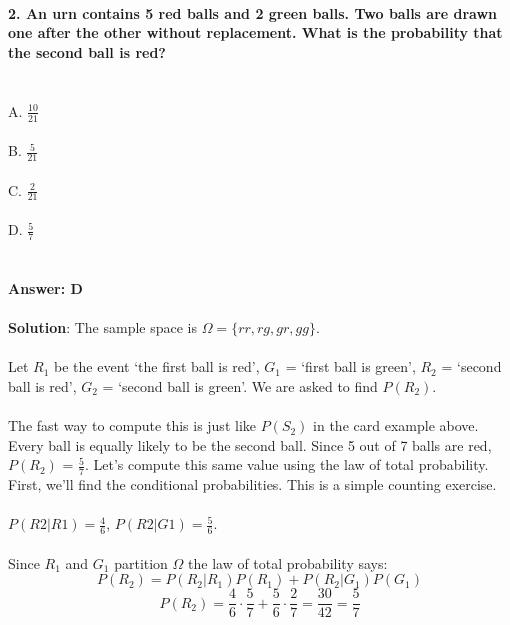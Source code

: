 \documentclass[prl,twocolumn,showpacs,preprintnumbers,superscriptaddress]{revtex4}
\theoremstyle{plain}
\theoremstyle{definition}
\begin{document}
\begin{widetext}
\\
\\
\\
\textbf{2. An urn contains 5 red balls and 2 green balls. Two balls are drawn one after the other without replacement. What is the probability that the second ball is red?}
\\
\\
\\
A. $\frac{10}{21}$\\
\\
B. $\frac{5}{21}$\\
\\
C. $\frac{2}{21}$\\
\\
D. $\frac{5}{7}$
\\
\\
\\
\textbf{Answer: D}
\\
\\
\textbf{Solution}:
The sample space is $\Omega = \{rr, rg, gr, gg\}$.
\\
\\
Let $R_{1}$ be the event ‘the first ball is red’, $G_{1}$ = ‘first ball is green’, $R_{2}$ = ‘second ball is red’, $G_{2}$ = ‘second ball is green’. We are asked to find $P(R_{2})$.
\\
\\
The fast way to compute this is just like $P(S_{2})$ in the card example above. Every ball is equally likely to be the second ball. Since 5 out of 7 balls are red, $P(R_{2})$ = $\frac{5}{7}$.
Let’s compute this same value using the law of total probability. First, we’ll find the conditional probabilities. This is a simple counting exercise.
\\
\\
$P(R2|R1) = \frac{4}{6}$, $P(R2|G1) = \frac{5}{6}$.
\\
\\
Since $R_{1}$ and $G_{1}$ partition $\Omega$ the law of total probability says:
\begin{equation}
    P(R_{2}) = P(R_{2}|R_{1})P(R_{1}) + P(R_{2}|G_{1})P(G_{1}) {}\nonumber
\end{equation}
\begin{equation}
    P(R_{2}) = \frac{4}{6}\cdot \frac{5}{7} + \frac{5}{6}\cdot \frac{2}{7} = \frac{30}{42} = \frac{5}{7} {}\nonumber
\end{equation}
\\
\\
\\

\end{widetext}
\end{document}
